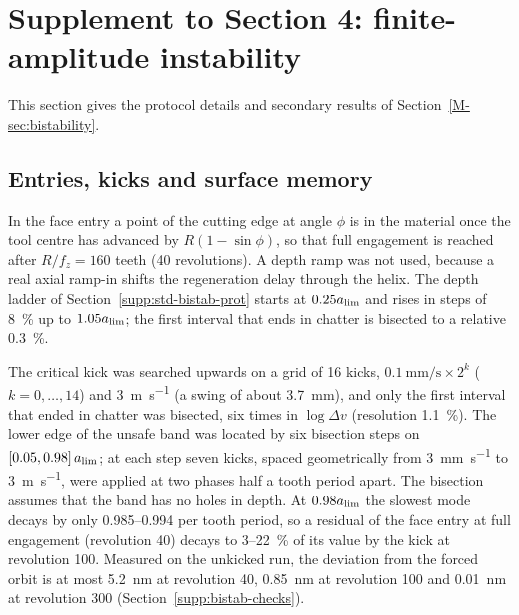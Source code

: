 \section{Supplement to Section 4: finite-amplitude instability}\label{supp:bistab}

This section gives the protocol details and secondary results of Section~\ref{M-sec:bistability}.

\subsection{Entries, kicks and surface memory}\label{supp:bistab-prot}

In the face entry a point of the cutting edge at angle $\phi$ is in the material once the tool centre has advanced by $R(1-\sin\phi)$, so that full engagement is reached after $R/f_z=160$ teeth (40 revolutions). A depth ramp was not used, because a real axial ramp-in shifts the regeneration delay through the helix. The depth ladder of Section~\ref{supp:std-bistab-prot} starts at $0.25a_{\lim}$ and rises in steps of \SI{8}{\percent} up to $1.05a_{\lim}$; the first interval that ends in chatter is bisected to a relative \SI{0.3}{\percent}.

The critical kick was searched upwards on a grid of 16 kicks, $\SI{0.1}{\milli\metre\per\second}\times2^k$ ($k=0,\dots,14$) and \SI{3}{\metre\per\second} (a swing of about \SI{3.7}{\milli\metre}), and only the first interval that ended in chatter was bisected, six times in $\log\Delta v$ (resolution \SI{1.1}{\percent}). The lower edge of the unsafe band was located by six bisection steps on $[0.05,0.98]\,a_{\lim}$; at each step seven kicks, spaced geometrically from \SI{3}{\milli\metre\per\second} to \SI{3}{\metre\per\second}, were applied at two phases half a tooth period apart. The bisection assumes that the band has no holes in depth. At $0.98a_{\lim}$ the slowest mode decays by only 0.985--0.994 per tooth period, so a residual of the face entry at full engagement (revolution 40) decays to 3--\SI{22}{\percent} of its value by the kick at revolution 100. Measured on the unkicked run, the deviation from the forced orbit is at most \SI{5.2}{\nano\metre} at revolution 40, \SI{0.85}{\nano\metre} at revolution 100 and \SI{0.01}{\nano\metre} at revolution 300 (Section~\ref{supp:bistab-checks}).


